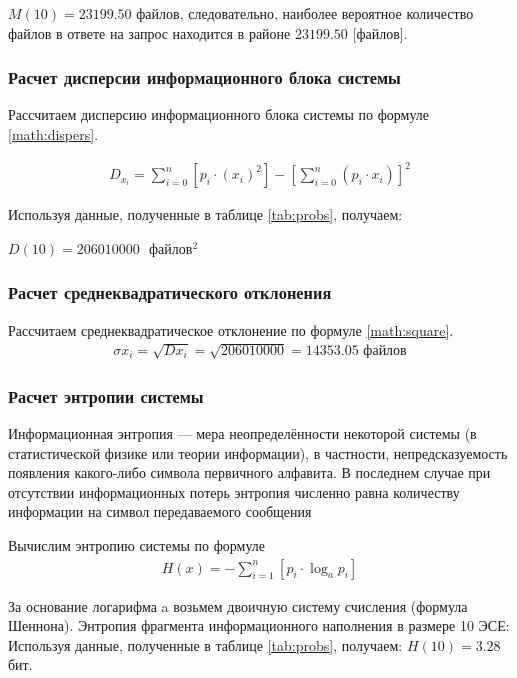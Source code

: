 \documentclass[a4paper,14pt]{extarticle}
\begin{document}
$M(10) = 23199.50$ файлов, следовательно, наиболее вероятное
количество файлов в ответе на запрос находится в районе $23199.50$ [файлов].

\subsubsection{Расчет дисперсии информационного блока системы}

Рассчитаем дисперсию информационного блока системы по формуле \ref{math:dispers}.

\begin{align}
D_{x_i}=\sum_{i=0}^{n}\left[p_i \cdot \left(x_i\right)^2 \right] - \left[\sum_{i=0}^{n} \left(p_i \cdot x_i\right) \right]^2
\label{math:dispers}
\end{align}

Используя данные, полученные в таблице \ref{tab:probs}, получаем:

$D(10) = 206010000\mbox{ }файлов^2$

\subsubsection{Расчет среднеквадратического отклонения}

Рассчитаем среднеквадратическое отклонение по формуле \ref{math:square}.
\begin{align}
\sigma x_i= \sqrt{Dx_i} = \sqrt{206010000} = 14353.05\mbox{ файлов}	
\label{math:square}
\end{align}

\subsubsection{Расчет энтропии системы}

Информационная энтропия --- мера неопределённости некоторой системы (в статистической физике или теории информации), в частности, непредсказуемость появления какого-либо символа первичного алфавита. В последнем случае при отсутствии информационных потерь энтропия численно равна количеству информации на символ передаваемого сообщения

Вычислим энтропию системы по формуле 
\begin{align}
H(x) = - \sum_{i=1}^{n}\left[p_i \cdot \log_ap_i\right]
\end{align}

За основание логарифма a возьмем двоичную систему счисления (формула Шеннона). Энтропия фрагмента информационного наполнения в размере 10 ЭСЕ:
Используя данные, полученные в таблице \ref{tab:probs}, получаем:
$H(10) = 3.28 $ бит.
\end{document}
